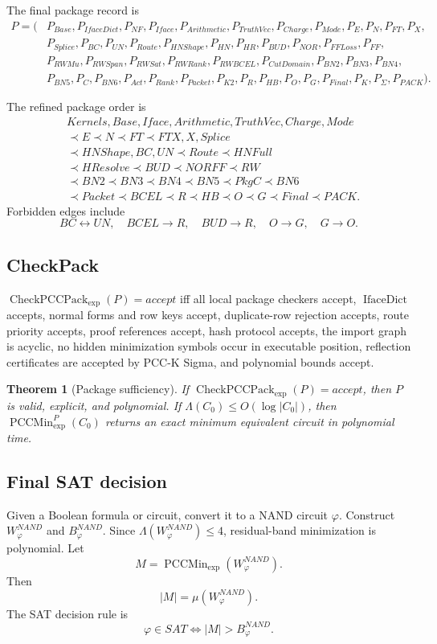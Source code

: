 \documentclass[10.5pt,a4paper]{article}
\newtheorem{theorem}{Theorem}[section]
\newcommand{\PCCMin}{\operatorname{PCCMin}_{\exp}}
\newcommand{\CheckPack}{\operatorname{CheckPCCPack}_{\exp}}
\newcommand{\IfaceDict}{\operatorname{IfaceDict}}
\begin{document}
The final package record is
\[
\begin{aligned}
P=(&P_{Base},P_{IfaceDict},P_{NF},P_{Iface},P_{Arithmetic},P_{TruthVec},P_{Charge},P_{Mode},P_E,P_N,P_{FT},P_X,\\
&P_{Splice},P_{BC},P_{UN},P_{Route},P_{HNShape},P_{HN},P_{HR},P_{BUD},P_{NOR},P_{FFLoss},P_{FF},\\
&P_{RWMu},P_{RWSpan},P_{RWSat},P_{RWRank},P_{RWBCEL},P_{CutDomain},P_{BN2},P_{BN3},P_{BN4},\\
&P_{BN5},P_C,P_{BN6},P_{Act},P_{Rank},P_{Packet},P_{K2},P_R,P_{HB},P_O,P_G,P_{Final},P_K,P_\Sigma,P_{PACK}).
\end{aligned}
\]

The refined package order is
\[
\begin{aligned}
&Kernels,Base,Iface,Arithmetic,TruthVec,Charge,Mode\\
&\prec E\prec N\prec FT\prec FTX,X,Splice\\
&\prec HNShape,BC,UN\prec Route\prec HNFull\\
&\prec HResolve\prec BUD\prec NORFF\prec RW\\
&\prec BN2\prec BN3\prec BN4\prec BN5\prec PkgC\prec BN6\\
&\prec Packet\prec BCEL\prec R\prec HB\prec O\prec G\prec Final\prec PACK.
\end{aligned}
\]
Forbidden edges include
\[
BC\leftrightarrow UN,
\quad BCEL\to R,
\quad BUD\to R,
\quad O\to G,
\quad G\to O.
\]

\subsection{CheckPack}
\(\CheckPack(P)=accept\) iff all local package checkers accept, \(\IfaceDict\) accepts, normal forms and row keys accept, duplicate-row rejection accepts, route priority accepts, proof references accept, hash protocol accepts, the import graph is acyclic, no hidden minimization symbols occur in executable position, reflection certificates are accepted by PCC-K Sigma, and polynomial bounds accept.

\begin{theorem}[Package sufficiency]
If \(\CheckPack(P)=accept\), then \(P\) is valid, explicit, and polynomial. If \(\Lambda(C_0)\le O(\log|C_0|)\), then \(\PCCMin^P(C_0)\) returns an exact minimum equivalent circuit in polynomial time.
\end{theorem}

\subsection{Final SAT decision}
Given a Boolean formula or circuit, convert it to a NAND circuit \(\varphi\). Construct \(W^{NAND}_\varphi\) and \(B^{NAND}_\varphi\). Since \(\Lambda(W^{NAND}_\varphi)\le4\), residual-band minimization is polynomial. Let
\[
M=\PCCMin(W^{NAND}_\varphi).
\]
Then
\[
|M|=\mu(W^{NAND}_\varphi).
\]
The SAT decision rule is
\[
\boxed{\varphi\in SAT\Longleftrightarrow |M|>B^{NAND}_\varphi.}
\]
\end{document}
